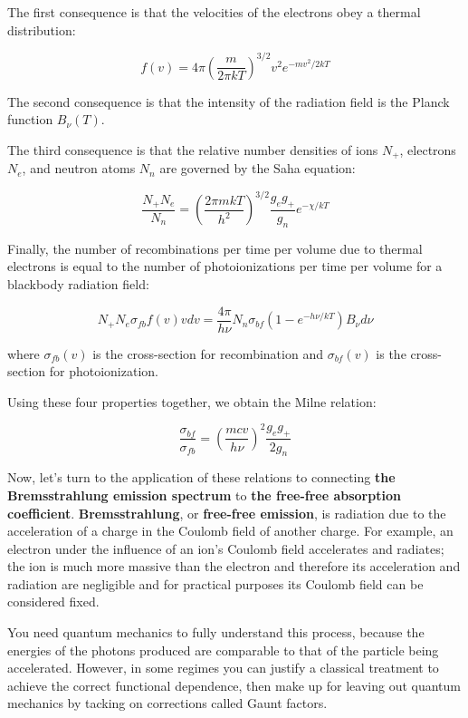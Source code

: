 \documentclass[12pt, letterpaper, preprint]{aastex}
\begin{document}
\begin{enumerate}
The first consequence
is that the velocities of the electrons obey
a thermal distribution:

\begin{equation}
f(v) = 4 \pi \left( \frac{m}{2 \pi kT} \right)^{3/2} v^2 e^{-mv^2 / 2 kT}
\end{equation}

The second consequence is that the intensity of the radiation field is the Planck function $B_\nu (T)$.

The third consequence is that the relative number densities of ions $N_+$, electrons $N_e$, and neutron atoms $N_n$ are governed by the Saha equation:

\begin{equation}
\frac{N_+ N_e}{N_n} = \left( \frac{2 \pi m k T}{h^2} \right)^{3/2} \frac{g_e g_+}{g_n} e^{-\chi / kT} 
\end{equation}

Finally, the number of recombinations per time per volume due to thermal electrons is equal to the number of photoionizations per time per volume for a blackbody radiation field:

\begin{equation}
N_+ N_e \sigma_{fb} f(v) v dv = 
\frac{4 \pi}{h \nu} N_n \sigma_{bf} (1-e^{-h\nu/kT}) B_\nu d\nu
\end{equation}

where $\sigma_{fb} (v)$ is the cross-section for recombination
and $\sigma_{bf} (v)$ is the cross-section for photoionization.

Using these four properties together, we obtain the Milne relation:

\begin{equation}
\frac{\sigma_{bf}}{\sigma_{fb}} = \left(\frac{mcv}{h\nu} \right)^2 \frac{g_e g_+}{2 g_n}
\end{equation}


Now, let's turn to the application of these relations
to connecting \textbf{the Bremsstrahlung emission spectrum}
to \textbf{the free-free absorption coefficient}.
\textbf{Bremsstrahlung}, or \textbf{free-free emission},
is radiation due to the acceleration of a charge in the Coulomb field of another charge. For example, an electron under the influence of an ion's Coulomb field accelerates and radiates; the ion is much more massive than the electron and therefore its acceleration and radiation are negligible and for practical purposes its Coulomb field can be considered fixed.

You need quantum mechanics to fully understand this process, because the energies of the photons produced are comparable to that of the particle being accelerated. However, in some regimes you can justify a classical treatment to achieve the correct functional dependence, then make up for leaving out quantum mechanics by tacking on corrections called Gaunt factors. 


\end{enumerate}
\end{document}
